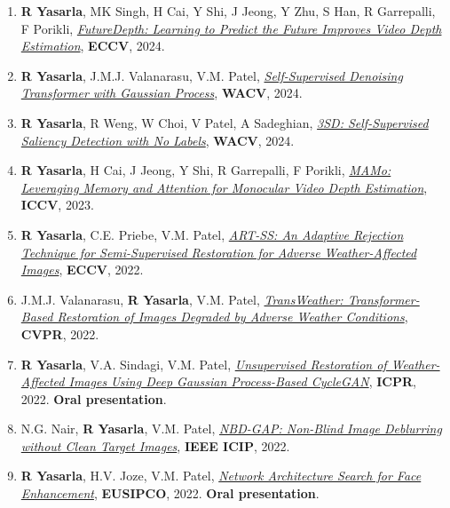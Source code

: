 \documentclass[margin,11pt]{resume}
\begin{document}
\begin{enumerate}[leftmargin=*,itemsep=0pt,topsep=2pt]
    \item \textbf{R Yasarla}, MK Singh, H Cai, Y Shi, J Jeong, Y Zhu, S Han, R Garrepalli, F Porikli, \textit{\href{https://arxiv.org/pdf/2403.12953.pdf}{FutureDepth: Learning to Predict the Future Improves Video Depth Estimation}}, \textbf{ECCV}, 2024.
    \item \textbf{R Yasarla}, J.M.J. Valanarasu, V.M. Patel, \textit{\href{https://openaccess.thecvf.com/content/WACV2024/papers/Yasarla_Self-Supervised_Denoising_Transformer_With_Gaussian_Process_WACV_2024_paper.pdf}{Self-Supervised Denoising Transformer with Gaussian Process}}, \textbf{WACV}, 2024.
    \item \textbf{R Yasarla}, R Weng, W Choi, V Patel, A Sadeghian, \textit{\href{https://arxiv.org/pdf/2203.04478.pdf}{3SD: Self-Supervised Saliency Detection with No Labels}}, \textbf{WACV}, 2024.
    \item \textbf{R Yasarla}, H Cai, J Jeong, Y Shi, R Garrepalli, F Porikli, \textit{\href{https://arxiv.org/pdf/2307.14336.pdf}{MAMo: Leveraging Memory and Attention for Monocular Video Depth Estimation}}, \textbf{ICCV}, 2023.
    \item \textbf{R Yasarla}, C.E. Priebe, V.M. Patel, \textit{\href{https://arxiv.org/pdf/2203.09275.pdf}{ART-SS: An Adaptive Rejection Technique for Semi-Supervised Restoration for Adverse Weather-Affected Images}}, \textbf{ECCV}, 2022.
    \item J.M.J. Valanarasu, \textbf{R Yasarla}, V.M. Patel, \textit{\href{https://openaccess.thecvf.com/content/CVPR2022/papers/Valanarasu_TransWeather_Transformer-Based_Restoration_of_Images_Degraded_by_Adverse_Weather_Conditions_CVPR_2022_paper.pdf}{TransWeather: Transformer-Based Restoration of Images Degraded by Adverse Weather Conditions}}, \textbf{CVPR}, 2022.
    \item \textbf{R Yasarla}, V.A. Sindagi, V.M. Patel, \textit{\href{https://arxiv.org/pdf/2204.10970.pdf}{Unsupervised Restoration of Weather-Affected Images Using Deep Gaussian Process-Based CycleGAN}}, \textbf{ICPR}, 2022. \textbf{Oral presentation}.
    \item N.G. Nair, \textbf{R Yasarla}, V.M. Patel, \textit{\href{https://ieeexplore.ieee.org/abstract/document/9897543}{NBD-GAP: Non-Blind Image Deblurring without Clean Target Images}}, \textbf{IEEE ICIP}, 2022.
    \item \textbf{R Yasarla}, H.V. Joze, V.M. Patel, \textit{\href{https://arxiv.org/abs/2105.06528}{Network Architecture Search for Face Enhancement}}, \textbf{EUSIPCO}, 2022. \textbf{Oral presentation}.

\end{enumerate}
\end{document}
